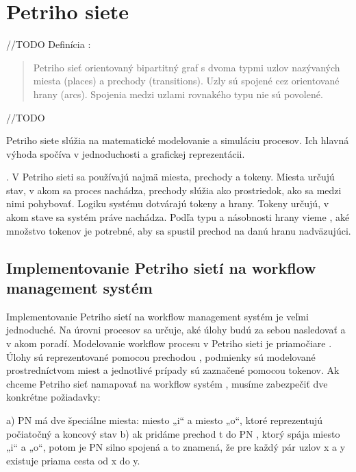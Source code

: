 





\section{Petriho siete}

//TODO
Definícia \cite{workflow_systemy} :
\begin{quote}
	Petriho sieť orientovaný bipartitný graf s dvoma typmi uzlov nazývaných miesta (places) a prechody (transitions). Uzly sú spojené cez orientované hrany (arcs). Spojenia medzi uzlami rovnakého typu nie sú povolené.
\end{quote}
//TODO



Petriho siete slúžia na matematické modelovanie a simuláciu procesov. Ich hlavná výhoda spočíva v jednoduchosti a grafickej reprezentácii. 


.  V Petriho sieti sa používajú najmä miesta, prechody a tokeny. Miesta určujú stav, v akom sa proces nachádza, prechody slúžia ako prostriedok, ako sa medzi nimi pohybovať. Logiku systému dotvárajú tokeny a hrany. Tokeny určujú, v akom stave sa systém práve nachádza. Podľa typu a násobnosti hrany vieme ,  aké množstvo tokenov je potrebné, aby sa spustil prechod na danú hranu nadväzujúci.


\subsection{Implementovanie Petriho sietí na workflow management systém}
\label{kap:teoria_petriho_siete_na_workflow}

Implementovanie Petriho sietí na workflow management systém je veľmi jednoduché.
Na úrovni procesov sa určuje,  aké úlohy budú za sebou nasledovať a v akom poradí. Modelovanie workflow procesu v Petriho sieti je priamočiare . Úlohy sú reprezentované pomocou prechodou , podmienky sú modelované prostredníctvom  miest a jednotlivé prípady sú zaznačené pomocou tokenov.  Ak chceme Petriho sieť namapovať na workflow systém , musíme zabezpečiť dve konkrétne požiadavky:

a) PN má dve špeciálne miesta: miesto „i“ a miesto „o“, ktoré reprezentujú počiatočný a koncový stav
b) ak pridáme prechod t do PN , ktorý spája miesto „i“ a „o“, potom je PN silno spojená a to znamená, že pre každý pár uzlov x a y  existuje priama cesta od x do y. 


